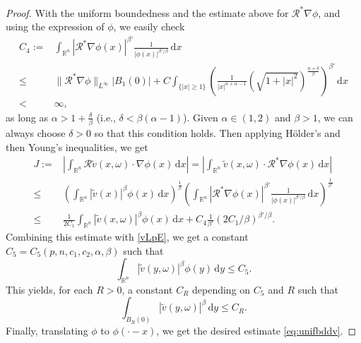 \documentclass[10pt,a4paper]{amsart}
\def\upd{\mathrm{d}}
\newcommand{\R}{{\mathbb{R}}}
\newcommand{\dd}{\mathrm{d}}
\begin{document}
\begin{proof}
With the uniform boundedness and the estimate above for $\mathcal{R}^*\nabla \phi$, and using the expression of $\phi$, we easily check
\begin{equation*}
\begin{aligned}
    C_4 := &\int_{\R^n} \left|\mathcal{R}^*\nabla \phi(x)\right|^{\beta'} \frac{1}{|\phi(x)|^{\beta'/\beta}}\,\dd x\\
    \le & \|\mathcal{R}^*\nabla \phi\|_{L^\infty}|B_1(0)| + C\int_{\{|x|\ge 1\}} \left(\frac{1}{|x|^{n+\alpha-1}} (\sqrt{1+|x|^2})^{\frac{n+\delta}\beta}\right)^{\beta'}\,\dd x\\
    < &\infty,
    \end{aligned}
\end{equation*}
as long as $\alpha > 1+\frac{\delta}{\beta}$ (i.e., $\delta < \beta(\alpha-1)$). Given $\alpha \in (1,2)$ and $\beta >1$, we can always choose $\delta>0$ so that this condition holds. Then applying H\"older's and then Young's inequalities, we get
\begin{equation*}
\begin{aligned}
    J := &\left|\int_{\mathbb{R}^n}  \mathcal{R} \widetilde v (x,\omega)\cdot \nabla \phi(x)\,\mathrm{d}x\right| = \left|\int_{\mathbb{R}^n} \widetilde v (x,\omega)\cdot \mathcal{R}^*\nabla \phi(x)\,\mathrm{d}x\right|\\
    \le & \left(\int_{\R^n} |\widetilde v(x)|^\beta \phi(x)\,\dd x\right)^{\frac1{\beta}}\left(\int_{\R^n} |\mathcal{R}^*\nabla \phi(x)|^{\beta'} \frac{1}{|\phi(x)|^{\beta'/\beta}}\,\dd x\right)^{\frac{1}{\beta'}}\\
    \le &\frac{1}{2C_1} \int_{\R^n}|\widetilde v(x,\omega)|^\beta \phi(x)\,\upd x + C_4\frac{1}{\beta'}(2C_1/\beta)^{\beta'/\beta}.
    \end{aligned}
\end{equation*}
Combining this estimate with \eqref{vLpE}, we get a constant $C_5=C_5(p,n,c_1,c_2,\alpha,\beta)$ such that
\begin{equation}
    \int_{\R^n} |\widetilde{v}(y,\omega)|^\beta \phi(y)\,\dd y \le C_5.
\end{equation}
This yields, for each $R>0$, a constant $C_R$ depending on $C_5$ and $R$ such that
\begin{equation*}
    \int_{B_R(0)} |\widetilde{v}(y,\omega)|^\beta \,\dd y \le C_R.
\end{equation*}
Finally, translating $\phi$ to $\phi(\cdot -x)$, we get the desired estimate \eqref{eq:unifbddv}.

\medskip


\end{proof}
\end{document}
